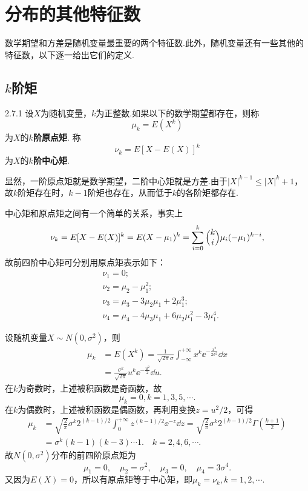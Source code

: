\section{分布的其他特征数}
数学期望和方差是随机变量最重要的两个特征数.此外，随机变量还有一些其他的特征数，以下逐一给出它们的定义.

\subsection{$k$阶矩}
\begin{definition}{}{2.7.1}
  设$X$为随机变量，$k$为正整数.如果以下的数学期望都存在，则称
  \begin{equation}\label{eq2.7.1}
    \mu_k = E(X^k)
  \end{equation}
  为$X$的\textbf{$k$阶原点矩}. 称
  \begin{equation}
    \nu_k = E[X - E(X)]^k
  \end{equation}
  为$X$的\textbf{$k$阶中心矩}.
\end{definition}

显然，一阶原点矩就是数学期望，二阶中心矩就是方差.由于$|X|^{k-1}\le |X|^k+1$，故$k$阶矩存在时，$k-1$阶矩也存在，从而低于$k$的各阶矩都存在.

中心矩和原点矩之间有一个简单的关系，事实上
\[
  \nu_k = E[X-E(X)]^k = E(X-\mu_1)^k = \sum_{i=0}^k\Binom ki\mu_i(-\mu_1)^{k-i},
\]
故前四阶中心矩可分别用原点矩表示如下：
\begin{align*}
  & \nu_1 = 0 ; \\
  & \nu_2 = \mu_2 - \mu_1^2; \\
  & \nu_3 = \mu_3 - 3\mu_2\mu_1 + 2\mu_1^3; \\
  & \nu_4 = \mu_4 - 4\mu_3\mu_1 + 6\mu_2\mu_1^2 - 3\mu_1^4.
\end{align*}

\begin{example}
  设随机变量$X\sim N(0,\sigma^2)$，则
    \begin{align*}
      \mu_k & = E(X^k) = \frac1{\sqrt{2\pi}\sigma}\int_{-\infty}^{+\infty}
        x^k\ee^{-\frac{x^2}{2\sigma^2}} \dd x \\
        & = \frac{\sigma^k}{\sqrt{2\pi}} u^k\ee^{-\frac{u^2}2}\dd u.
    \end{align*}
  在$k$为奇数时，上述被积函数是奇函数，故
  \[
    \mu_k = 0, k=1,3,5,\cdots.
  \]
  在$k$为偶数时，上述被积函数是偶函数，再利用变换$z=u^2/2$，可得
  \begin{align*}
    \mu_k & = \sqrt{\frac2\pi}\sigma^k2^{(k-1)/2}
    \int_0^{+\infty}z^{(k-1)/2}\ee^{-z} \dd z = \sqrt{\frac2\pi}\sigma^k2^{(k-1)/2}
      \Gamma\left(  \frac{k+1}2 \right) \\
    & = \sigma^k(k-1)(k-3)\cdots1.\quad k=2,4,6,\cdots.
  \end{align*}
  故$N(0,\sigma^2)$分布的前四阶原点矩为
  \[
    \mu_1 = 0,\quad \mu_2 = \sigma^2,\quad
    \mu_3 = 0,\quad \mu_4 = 3\sigma^4.
  \]
  又因为$E(X)=0$，所以有原点矩等于中心矩，即$\mu_k=\nu_k,k=1,2,\cdots$.
\end{example}

